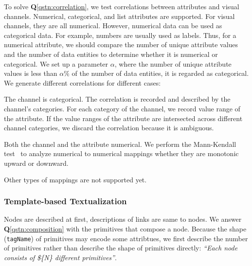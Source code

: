 To solve \textbf{Q}\ref{qstn:correlation}, we test correlations between attributes and visual channels.
Numerical, categorical, and list attributes are supported.
For visual channels, they are all numerical.
However, numerical data can be used as categorical data.
For example, numbers are usually used as labels.
Thus, for a numerical attribute, we should compare the number of unique attribute values and the number of data entities to determine whether it is numerical or categorical.
We set up a parameter $\alpha$, where the number of unique attribute values is less than $\alpha \%$ of the number of data entities, it is regarded as categorical.
We generate different correlations for different cases:
\begin{compactitem}
    \item The channel is categorical. The correlation is recorded and described by the channel's categories. For each category of the channel, we record value range of the attribute. %
    If the value ranges of the attribute are intersected across different channel categories, we discard the correlation because it is ambiguous.
    \item Both the channel and the attribute numerical. We perform the Mann-Kendall test~\cite{10.2307/1907187, kendall1948rank} to analyze numerical to numerical mappings whether they are monotonic upward or downward.
    \item Other types of mappings are not supported yet.
\end{compactitem}


\subsubsection {Template-based Textualization}
Nodes are described at first, descriptions of links are same to nodes.
We answer \textbf{Q}\ref{qstn:composition} with the primitives that compose a node.
Because the shape (\texttt{tagName}) of primitives may encode some attribtues, we first describe the number of primitives rather than describe the shape of primitives directly:
\textit{``Each node consists of \$\{N\} different primitives''}. 

